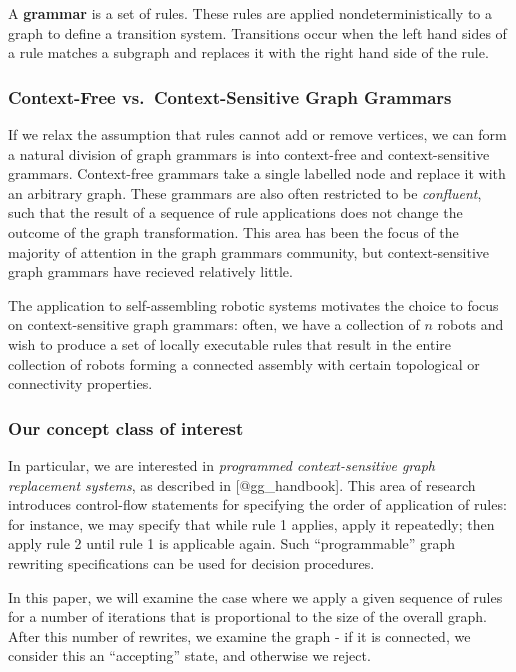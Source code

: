 \documentclass[]{article}
\begin{document}
A \textbf{grammar} is a set of rules. These rules are applied
nondeterministically to a graph to define a transition system.
Transitions occur when the left hand sides of a rule matches a subgraph
and replaces it with the right hand side of the rule.

\subsubsection{Context-Free vs.~Context-Sensitive Graph
Grammars}\label{context-free-vs.context-sensitive-graph-grammars}

If we relax the assumption that rules cannot add or remove vertices, we
can form a natural division of graph grammars is into context-free and
context-sensitive grammars. Context-free grammars take a single labelled
node and replace it with an arbitrary graph. These grammars are also
often restricted to be \emph{confluent}, such that the result of a
sequence of rule applications does not change the outcome of the graph
transformation. This area has been the focus of the majority of
attention in the graph grammars community, but context-sensitive graph
grammars have recieved relatively little.

The application to self-assembling robotic systems motivates the choice
to focus on context-sensitive graph grammars: often, we have a
collection of \(n\) robots and wish to produce a set of locally
executable rules that result in the entire collection of robots forming
a connected assembly with certain topological or connectivity
properties.

\subsubsection{Our concept class of
interest}\label{our-concept-class-of-interest}

In particular, we are interested in \emph{programmed context-sensitive
graph replacement systems}, as described in {[}@gg\_handbook{]}. This
area of research introduces control-flow statements for specifying the
order of application of rules: for instance, we may specify that while
rule 1 applies, apply it repeatedly; then apply rule 2 until rule 1 is
applicable again. Such ``programmable'' graph rewriting specifications
can be used for decision procedures.

In this paper, we will examine the case where we apply a given sequence
of rules for a number of iterations that is proportional to the size of
the overall graph. After this number of rewrites, we examine the graph -
if it is connected, we consider this an ``accepting'' state, and
otherwise we reject.
\end{document}
